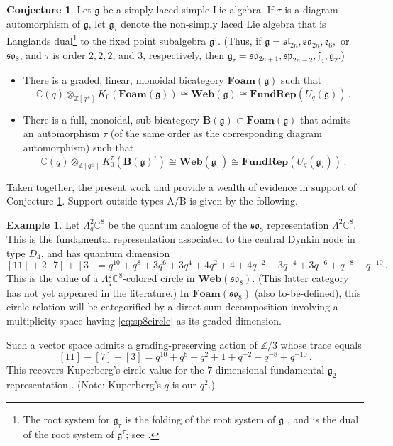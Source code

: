 \documentclass[10pt]{amsart}
\numberwithin{equation}{section}
\theoremstyle{definition}
\newtheorem{conj}[thm]{Conjecture}
\newtheorem{example}[thm]{Example}
\def\C{{\mathbb C}}
\def\Z{{\mathbb Z}}
\newcommand{\sln}[1][n]{\mathfrak{sl}_{#1}}
\newcommand{\spn}[1][2n]{\mathfrak{sp}_{#1}}
\newcommand{\son}[1][2n+1]{\mathfrak{so}_{#1}}
\newcommand{\FRep}{\mathbf{FundRep}}
\newcommand{\Web}{\mathbf{Web}}
\newcommand{\Foam}{\mathbf{Foam}}
\begin{document}
\begin{conj}\label{conj:metaweb}
Let $\mathfrak{g}$ be a simply laced simple Lie algebra.
If $\tau$ is a diagram automorphism of $\mathfrak{g}$, 
let $\mathfrak{g}_{\tau}$ denote the non-simply laced Lie algebra that is
Langlands dual\footnote{The root system for $\mathfrak{g}_{\tau}$ 
is the folding of the root system of $\mathfrak{g}$ \cite{Stembridge}, 
and is the dual of the root system of $\mathfrak{g}^{\tau}$; see \cite{MOfolding}.} 
to the fixed point subalgebra $\mathfrak{g}^{\tau}$.
(Thus, if $\mathfrak{g} = \sln[2n], \son[2n], \mathfrak{e}_6,$ or $\son[8]$, 
and $\tau$ is order $2, 2, 2$, and $3$, respectively,
then $\mathfrak{g}_{\tau}= \son, \spn[2n-2], \mathfrak{f}_4, \mathfrak{g}_2$.)
\begin{itemize}
\item There is a graded, linear, monoidal bicategory $\Foam(\mathfrak{g})$ such that 
\[
\C(q) \otimes_{\Z[q^{\pm}]} K_0(\Foam(\mathfrak{g}))
	\cong \Web(\mathfrak{g}) \cong \FRep(U_q(\mathfrak{g})) \, .
	\]
\item There is a full, monoidal, sub-bicategory $\mathbf{B}(\mathfrak{g}) \subset \Foam(\mathfrak{g})$ 
that admits an automorphism $\tau$ (of the same order as the corresponding diagram automorphism) 
such that
\[
\C(q) \otimes_{\Z[q^{\pm}]} K_0^{\tau}(\mathbf{B}(\mathfrak{g})^\tau)
	\cong \Web(\mathfrak{g}_{\tau}) \cong \FRep(U_q(\mathfrak{g}_{\tau})) \, .
	\]
\end{itemize}
\end{conj}

Taken together, 
the present work and \cite{BER} provide a wealth of evidence 
in support of Conjecture \ref{conj:metaweb}.
Support outside types A/B is given by the following.

\begin{example}
Let $\Lambda_q^2\C^8$ be the quantum analogue of the $\son[8]$ representation $\Lambda^2 \C^8$. 
This is the fundamental representation associated to the central Dynkin node in type $D_4$, 
and has quantum dimension
\begin{equation}\label{eq:sp8circle}
[11]+2[7]+[3] =
q^{10}+q^{8}+3 q^{6}+3q^{4}+4q^{2}+4+4q^{-2}+3q^{-4}+3q^{-6}+q^{-8}+q^{-10} \, .
\end{equation}
This is the value of a $\Lambda_q^2\C^8$-colored circle in $\Web(\son[8])$. 
(This latter category has not yet appeared in the literature.)
In $\Foam(\son[8])$ (also to-be-defined), this circle relation will be categorified 
by a direct sum decomposition involving a multiplicity space having \eqref{eq:sp8circle} 
as its graded dimension.

Such a vector space admits a grading-preserving action of $\Z/3$ whose 
trace equals 
\[
[11] - [7] + [3] = q^{10} + q^{8} + q^{2} + 1 + q^{-2} + q^{-8} + q^{-10} \, .
\]
This recovers Kuperberg's circle value for the $7$-dimensional fundamental $\mathfrak{g}_2$ representation
\cite[p.~14]{Kup}. (Note: Kuperberg's $q$ is our $q^2$.)
	\end{example}
	
\end{document}
